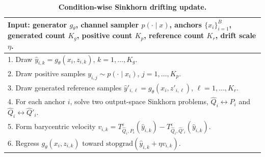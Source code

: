 \documentclass[10pt,journal]{IEEEtran}
\newcommand{\tablestyle}[2]{\setlength{\tabcolsep}{#1}\renewcommand{\arraystretch}{#2}}
\begin{document}
\begin{table}[t]
\caption{\textbf{Condition-wise Sinkhorn drifting update.}}
\label{tab:condition-wise-sinkhorn-algorithm}
\centering
\tablestyle{3.8pt}{1.04}
\footnotesize
\begin{tabular}{@{}p{}@{}}
\toprule
\textbf{Input:} generator \(g_\theta\), channel sampler \(p(\cdot\mid x)\), anchors \(\{x_i\}_{i=1}^{B}\), generated count \(K_g\), positive count \(K_p\), reference count \(K_r\), drift scale \(\eta\). \\
\midrule
1. Draw \(\hat y_{i,k}=g_\theta(x_i,z_{i,k})\), \(k=1,\ldots,K_g\). \\
2. Draw positive samples \(y_{i,j}\sim p(\cdot\mid x_i)\), \(j=1,\ldots,K_p\). \\
3. Draw generated reference samples \(\hat y'_{i,\ell}=g_\theta(x_i,z'_{i,\ell})\), \(\ell=1,\ldots,K_r\). \\
4. For each anchor \(i\), solve two output-space Sinkhorn problems, \(\hat Q_i\!\leftrightarrow\!P_i\) and \(\hat Q_i\!\leftrightarrow\!\hat Q'_i\). \\
5. Form barycentric velocity \(v_{i,k}=T^\varepsilon_{\hat Q_i,P_i}(\hat y_{i,k})-T^\varepsilon_{\hat Q_i,\hat Q'_i}(\hat y_{i,k})\). \\
6. Regress \(g_\theta(x_i,z_{i,k})\) toward \(\mathrm{stopgrad}(\hat y_{i,k}+\eta v_{i,k})\). \\
\bottomrule
\end{tabular}
\end{table}
\end{document}
